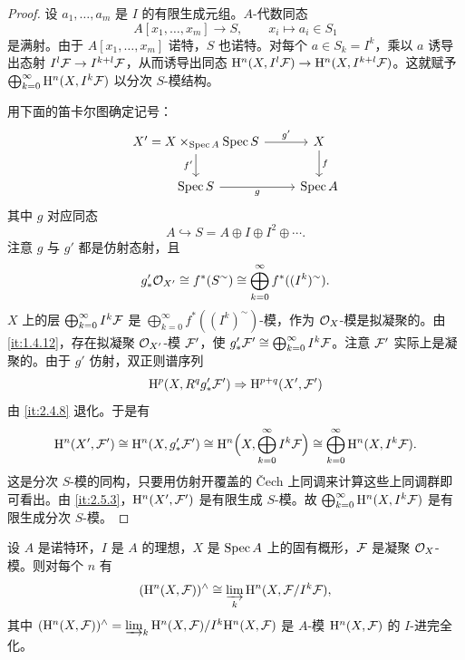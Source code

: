 \begin{proof}
设 $a_1,\dots,a_m$ 是 $I$ 的有限生成元组。$A$-代数同态
\[
A[x_1,\dots,x_m]\to S,\qquad x_i\mapsto a_i\in S_1
\]
是满射。由于 $A[x_1,\dots,x_m]$ 诺特，$S$ 也诺特。对每个 $a\in S_k=I^k$，乘以 $a$ 诱导出态射 $I^l\mathcal{F}\to I^{k+l}\mathcal{F}$，从而诱导出同态 $\mathrm{H}^n(X,I^l\mathcal{F})\to\mathrm{H}^n(X,I^{k+l}\mathcal{F})$。这就赋予 $\bigoplus_{k=0}^\infty \mathrm{H}^n(X,I^k\mathcal{F})$ 以分次 $S$-模结构。

用下面的笛卡尔图确定记号：
\[
\begin{tikzcd}
X'=X\fib_{\Spec A}\Spec S \arrow[r,"g'"] \arrow[d,"f'"'] & X \arrow[d,"f"] \\
\Spec S \arrow[r,"g"'] & \Spec A
\end{tikzcd}
\]
其中 $g$ 对应同态
\[
A\hookrightarrow S=A\oplus I\oplus I^2\oplus\cdots.
\]
注意 $g$ 与 $g'$ 都是仿射态射，且
\[
g'_*\mathcal{O}_{X'}\cong f^*(S^{\sim})\cong\bigoplus_{k=0}^\infty f^*((I^k)^{\sim}).
\]
$X$ 上的层 $\bigoplus_{k=0}^\infty I^k\mathcal{F}$ 是 $\bigoplus_{k=0}^\infty f^*((I^k)^{\sim})$-模，作为 $\mathcal{O}_X$-模是拟凝聚的。由 \ref{it:1.4.12}，存在拟凝聚 $\mathcal{O}_{X'}$-模 $\mathcal{F}'$，使 $g'_*\mathcal{F}'\cong\bigoplus_{k=0}^\infty I^k\mathcal{F}$。注意 $\mathcal{F}'$ 实际上是凝聚的。由于 $g'$ 仿射，双正则谱序列
\[
\mathrm{H}^p(X,R^qg'_*\mathcal{F}')\Rightarrow\mathrm{H}^{p+q}(X',\mathcal{F}')
\]
由 \ref{it:2.4.8} 退化。于是有
\[
\mathrm{H}^n(X',\mathcal{F}')\cong\mathrm{H}^n(X,g'_*\mathcal{F}')\cong\mathrm{H}^n\Bigl(X,\bigoplus_{k=0}^\infty I^k\mathcal{F}\Bigr)\cong\bigoplus_{k=0}^\infty\mathrm{H}^n(X,I^k\mathcal{F}).
\]
这是分次 $S$-模的同构，只要用仿射开覆盖的 Čech 上同调来计算这些上同调群即可看出。由 \ref{it:2.5.3}，$\mathrm{H}^n(X',\mathcal{F}')$ 是有限生成 $S$-模。故 $\bigoplus_{k=0}^\infty\mathrm{H}^n(X,I^k\mathcal{F})$ 是有限生成分次 $S$-模。
\end{proof}

\begin{theorem}\label{it:2.5.6}
设 $A$ 是诺特环，$I$ 是 $A$ 的理想，$X$ 是 $\operatorname{Spec} A$ 上的固有概形，$\mathcal{F}$ 是凝聚 $\mathcal{O}_X$-模。则对每个 $n$ 有
\[
(\mathrm{H}^n(X,\mathcal{F}))^{\wedge}\cong\varinjlim_k \mathrm{H}^n(X,\mathcal{F}/I^k\mathcal{F}),
\]
其中 $(\mathrm{H}^n(X,\mathcal{F}))^{\wedge}=\varinjlim_k \mathrm{H}^n(X,\mathcal{F})/I^k\mathrm{H}^n(X,\mathcal{F})$ 是 $A$-模 $\mathrm{H}^n(X,\mathcal{F})$ 的 $I$-进完全化。
\end{theorem}

